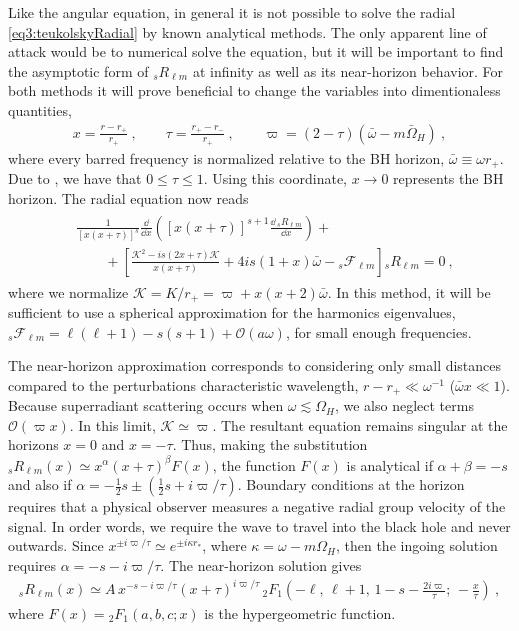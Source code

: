 Like the angular equation, in general it is not possible to solve the radial \eqref{eq3:teukolskyRadial} by known analytical methods.
The only apparent line of attack would be to numerical solve the equation, but it will be important to find the asymptotic form of ${}_{s}R_{\ell m}$ at infinity as well as its near-horizon behavior. 
For both methods it will prove beneficial to change the variables into dimentionaless quantities,
\begin{align}
    x = \frac{r - r_{+}}{r_{+}} ~,\qquad \tau = \frac{r_{+} - r_{-}}{r_{+}} ~,\qquad \varpi = (2-\tau)( \bar\omega - m \bar{\Omega}_H) ~,
\end{align}
where every barred frequency is normalized relative to the BH horizon, $\bar\omega\equiv\omega r_{+}$. Due to , we have that $0\le\tau\le 1$. Using this coordinate, $x\to0$ represents the BH horizon. The radial equation now reads
\begin{align}
    \label{eq3:radialTeukolskyAdimensional}
    \begin{split}
        & \frac{1}{[x(x+\tau)]^s} \frac{\dd}{\dd x}\left( [x(x+\tau)]^{s+1} \frac{\dd \,{}_{s}R_{\ell m}}{\dd x} \right) + \\
        &\qquad + \left[ \frac{\mathscr{K}^2 - i s (2 x+\tau) \mathscr{K}}{x(x+\tau)} + 4 i s (1 + x)\bar{\omega} - {}_{s}\mathscr{F}_{\ell m} \right] {}_{s}R_{\ell m} = 0 ~,
    \end{split}
\end{align}
where we normalize $\mathscr{K} = K/r_{+} = \varpi + x(x+2)\bar{\omega}$. In this method, it will be sufficient to use a spherical approximation for the harmonics eigenvalues, ${}_{s}\mathscr{F}_{\ell m} = \ell(\ell+1) - s(s+1) + \mathscr{O}(a\omega)$, for small enough frequencies.

The near-horizon approximation corresponds to considering only small distances compared to the perturbations characteristic wavelength, $r-r_{+} \ll \omega^{-1}$ ($\bar{\omega} x \ll 1$).
Because superradiant scattering occurs when $\omega\lesssim\Omega_H$, we also neglect terms $\mathscr{O}(\varpi x)$.
In this limit, $\mathscr{K}\simeq\varpi$.
The resultant equation remains singular at the horizons $x=0$ and $x=-\tau$. Thus, making the substitution ${}_{s}R_{\ell m}(x)\simeq x^\alpha (x+\tau)^\beta F(x)$, the function $F(x)$ is analytical if $\alpha+\beta=-s$ and also if $\alpha=-\tfrac{1}{2} s \pm \left(\tfrac{1}{2} s + i \varpi/\tau \right)$.
Boundary conditions at the horizon requires that a physical observer measures a negative radial group velocity of the signal.
In order words, we require the wave to travel into the black hole and never outwards.
Since $x^{\pm i \varpi/\tau} \simeq e^{\pm i \kappa r_{*}}$, where $\kappa=\omega - m \Omega_H$, then the ingoing solution requires $\alpha=-s-i\varpi/\tau$. The near-horizon solution gives
\begin{align}
    \label{eq3:RnearSolution}
    {}_{s}R_{\ell m}(x) \simeq A \, x^{-s-i\varpi/\tau} (x+\tau)^{i\varpi/\tau} \,{}_{2}F_1\left( -\ell, \,\ell+1, \,1-s-\frac{2i\varpi}{\tau}; \,-\frac{x}{\tau}\right) ~,
\end{align}
where $F(x)={}_{2}F_1(a,b,c; x)$ is the hypergeometric function.

